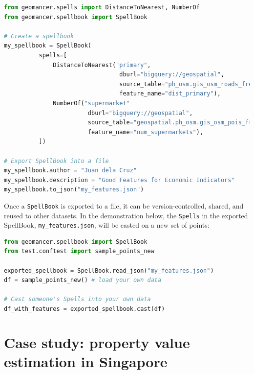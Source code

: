 \documentclass{article}
\begin{document}
\begin{lstlisting}[language=Python]
from geomancer.spells import DistanceToNearest, NumberOf
from geomancer.spellbook import SpellBook

# Create a spellbook
my_spellbook = SpellBook(
          spells=[
              DistanceToNearest("primary",
                                 dburl="bigquery://geospatial",
                                 source_table="ph_osm.gis_osm_roads_free_1",
                                 feature_name="dist_primary"),
              NumberOf("supermarket"
                        dburl="bigquery://geospatial",
                        source_table="geospatial.ph_osm.gis_osm_pois_free_1",
                        feature_name="num_supermarkets"),
          ])

# Export SpellBook into a file
my_spellbook.author = "Juan dela Cruz"
my_spellbook.description = "Good Features for Economic Indicators"
my_spellbook.to_json("my_features.json")
\end{lstlisting}

Once a \texttt{SpellBook} is exported to a file, it can be version-controlled,
shared, and reused to other datasets. In the demonstration below, the
\texttt{Spells} in the exported SpellBook, \texttt{my\_features.json}, will be
casted on a new set of points:

\begin{lstlisting}[language=Python]
from geomancer.spellbook import SpellBook
from test.conftest import sample_points_new

exported_spellbook = SpellBook.read_json("my_features.json")
df = sample_points_new() # load your own data

# Cast someone's Spells into your own data
df_with_features = exported_spellbook.cast(df)
\end{lstlisting}

\section{Case study: property value estimation in Singapore}
\end{document}
